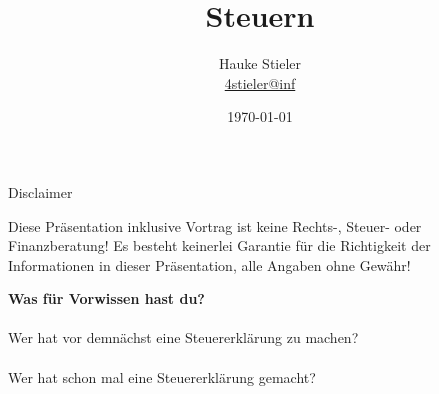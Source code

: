 \documentclass{beamer}
\author[Hauke Stieler]{Hauke Stieler\\\href{mailto:4stieler@informatik.uni-hamburg.de}{4stieler@inf}}
\title{Steuern}
\date{\today}
\begin{document}
	{
		\addtocounter{page}{-1}
		\frame{}
	}

	{
		\maketitle
		\addtocounter{page}{-1}
	}
	
	\begin{frame}{Disclaimer}
		\begin{center}
			Diese Präsentation inklusive Vortrag ist keine Rechts-, Steuer- oder Finanzberatung!\n
			Es besteht keinerlei Garantie für die Richtigkeit der Informationen in dieser Präsentation, alle Angaben ohne Gewähr!\n
		\end{center}
	\end{frame}

	\begin{frame}
		\begin{center}
			\textbf{Was für Vorwissen hast du?}\\\pause
			\hfill\\
			Wer hat vor demnächst eine Steuererklärung zu machen?\\\pause
			\hfill\\
			Wer hat schon mal eine Steuererklärung gemacht?
		\end{center}
	\end{frame}
\end{document}
